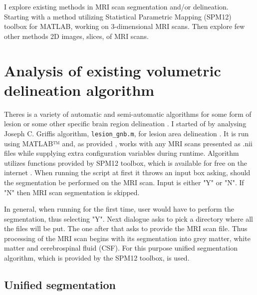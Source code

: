 \documentclass[12pt]{article}
\begin{document}
I explore existing methods in MRI scan segmentation and/or delineation. Starting with a method utilizing Statistical Parametric Mapping (SPM12) toolbox for MATLAB, working on 3-dimensional MRI scans. Then explore few other methods 2D images, slices, of MRI scans. 

\section{Analysis of existing volumetric delineation algorithm}
\label{sec:griffisLesion}

Theres is a variety of automatic and semi-automatic algorithms for some form of lesion or some other specific brain region delineation \cite{griffis2016voxel, ashton1997novel, de2015fast, li2015local, harmouche2015probabilistic, petoe2014template, gillebert2014automated, elliott2013temporally, llado2012automated, renz2011accuracy, chen2008voxelwise}. I started of by analysing Joseph C. Griffis algorithm, \texttt{lesion\_gnb.m}, for lesion area delineation \cite{griffis2016voxel}. It is run using MATLAB™ and, as provided \cite{griffisSrcDLweb}, works with any MRI scans presented as .nii files while supplying extra configuration variables during runtime. Algorithm utilizes functions provided by SPM12 toolbox, which is available for free on the internet \cite{spm12DL}. When running the script at first it throws an input box asking, should the segmentation be performed on the MRI scan. Input is either "Y" or "N". If "N" then MRI scan segmentation is skipped. 

In general, when running for the first time, user would have to perform the segmentation, thus selecting "Y". Next dialogue asks to pick a directory where all the files will be put. The one after that asks to provide the MRI scan file. Thus processing of the MRI scan begins with its segmentation into grey matter, white matter and cerebrospinal fluid (CSF). For this purpose unified segmentation algorithm, which is provided by the SPM12 toolbox, is used.

\subsection{Unified segmentation}
\label{ssec:unifiedSeg}
\end{document}
